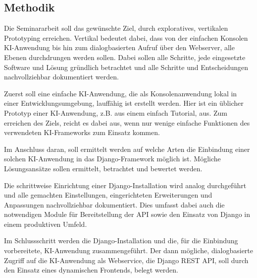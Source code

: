 \documentclass[12pt,oneside,titlepage,listof=totoc,bibliography=totoc]{scrartcl}
\begin{document}




\subsection{Methodik}

Die Seminararbeit soll das gewünschte Ziel, durch exploratives, vertikalen  Prototyping erreichen. Vertikal bedeutet dabei, dass von der einfachen Konsolen KI-Anwendung bis hin zum dialogbasierten Aufruf über den Webserver, alle Ebenen durchdrungen werden sollen. Dabei sollen alle Schritte, jede eingesetzte Software und Lösung gründlich betrachtet und alle Schritte und Entscheidungen nachvollziehbar dokumentiert werden.

Zuerst soll eine einfache KI-Anwendung, die als Konsolenanwendung lokal in einer Entwicklungsumgebung, lauffähig ist erstellt werden. Hier ist ein üblicher Prototyp einer KI-Anwendung, z.B. aus einem einfach Tutorial, aus. Zum erreichen des Ziels, reicht es dabei aus, wenn nur wenige einfache Funktionen des verwendeten KI-Frameworks zum Einsatz kommen.

Im Anschluss daran, soll ermittelt werden auf welche Arten die Einbindung einer solchen KI-Anwendung in das Django-Framework möglich ist. Mögliche Lösungsansätze sollen ermittelt, betrachtet und bewertet werden. 

Die schrittweise Einrichtung einer Django-Installation wird analog durchgeführt und alle gemachten Einstellungen, eingerichteten Erweiterungen und Anpassungen nachvollziehbar dokumentiert. Dies umfasst dabei auch die notwendigen Module für Bereitstellung der API sowie den Einsatz von Django in einem produktiven Umfeld. 

Im Schlussschritt werden die Django-Installation und die, für die Einbindung vorbereitete, KI-Anwendung zusammengeführt. Der dann mögliche, dialogbasierte Zugriff auf die KI-Anwendung als Webservice, die Django REST API, soll durch den Einsatz eines dynamischen Frontends, belegt werden. 
\end{document}
